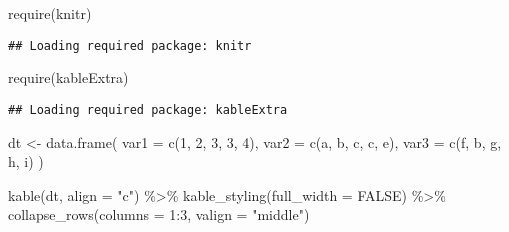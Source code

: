 \documentclass[
]{book}
\newenvironment{Shaded}{\begin{snugshade}}{\end{snugshade}}
\newcommand{\AttributeTok}[1]{\textcolor[rgb]{0.77,0.63,0.00}{#1}}
\newcommand{\ConstantTok}[1]{\textcolor[rgb]{0.00,0.00,0.00}{#1}}
\newcommand{\DecValTok}[1]{\textcolor[rgb]{0.00,0.00,0.81}{#1}}
\newcommand{\FunctionTok}[1]{\textcolor[rgb]{0.00,0.00,0.00}{#1}}
\newcommand{\NormalTok}[1]{#1}
\newcommand{\OtherTok}[1]{\textcolor[rgb]{0.56,0.35,0.01}{#1}}
\newcommand{\SpecialCharTok}[1]{\textcolor[rgb]{0.00,0.00,0.00}{#1}}
\newcommand{\StringTok}[1]{\textcolor[rgb]{0.31,0.60,0.02}{#1}}
\begin{document}
\begin{Shaded}
\begin{Highlighting}[]
\FunctionTok{require}\NormalTok{(knitr)}
\end{Highlighting}
\end{Shaded}

\begin{verbatim}
## Loading required package: knitr
\end{verbatim}

\begin{Shaded}
\begin{Highlighting}[]
\FunctionTok{require}\NormalTok{(kableExtra)}
\end{Highlighting}
\end{Shaded}

\begin{verbatim}
## Loading required package: kableExtra
\end{verbatim}

\begin{Shaded}
\begin{Highlighting}[]
\NormalTok{dt }\OtherTok{\textless{}{-}} \FunctionTok{data.frame}\NormalTok{(}
  \AttributeTok{var1 =} \FunctionTok{c}\NormalTok{(}\DecValTok{1}\NormalTok{, }\DecValTok{2}\NormalTok{, }\DecValTok{3}\NormalTok{, }\DecValTok{3}\NormalTok{, }\DecValTok{4}\NormalTok{),}
  \AttributeTok{var2 =} \FunctionTok{c}\NormalTok{(}\StringTok{\textquotesingle{}a\textquotesingle{}}\NormalTok{, }\StringTok{\textquotesingle{}b\textquotesingle{}}\NormalTok{, }\StringTok{\textquotesingle{}c\textquotesingle{}}\NormalTok{, }\StringTok{\textquotesingle{}c\textquotesingle{}}\NormalTok{, }\StringTok{\textquotesingle{}e\textquotesingle{}}\NormalTok{),}
  \AttributeTok{var3 =} \FunctionTok{c}\NormalTok{(}\StringTok{\textquotesingle{}f\textquotesingle{}}\NormalTok{, }\StringTok{\textquotesingle{}b\textquotesingle{}}\NormalTok{, }\StringTok{\textquotesingle{}g\textquotesingle{}}\NormalTok{, }\StringTok{\textquotesingle{}h\textquotesingle{}}\NormalTok{, }\StringTok{\textquotesingle{}i\textquotesingle{}}\NormalTok{)}
\NormalTok{)}

\FunctionTok{kable}\NormalTok{(dt, }\AttributeTok{align =} \StringTok{"c"}\NormalTok{) }\SpecialCharTok{\%\textgreater{}\%}
  \FunctionTok{kable\_styling}\NormalTok{(}\AttributeTok{full\_width =} \ConstantTok{FALSE}\NormalTok{) }\SpecialCharTok{\%\textgreater{}\%}
  \FunctionTok{collapse\_rows}\NormalTok{(}\AttributeTok{columns =} \DecValTok{1}\SpecialCharTok{:}\DecValTok{3}\NormalTok{, }\AttributeTok{valign =} \StringTok{"middle"}\NormalTok{)}
\end{Highlighting}
\end{Shaded}
\end{document}
